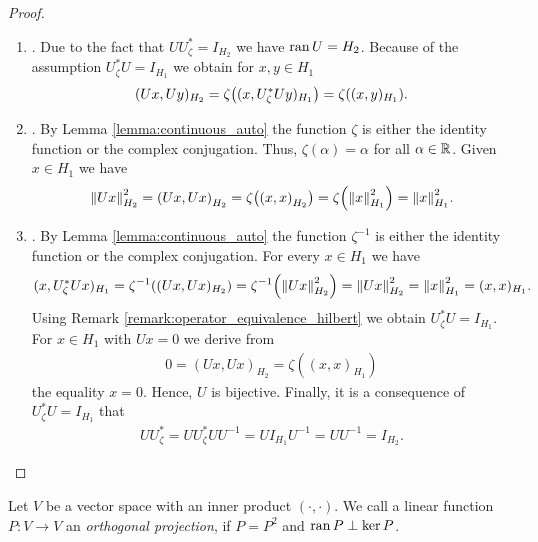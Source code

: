 \begin{proof}
	\begin{enumerate}
		\phantom{}
		\item[]. Due to the fact that $U U_\zeta^\ast = I_{H_2}$ we have $\ran U = H_2$. Because of the assumption $U_\zeta^\ast U = I_{H_1}$ we obtain for $x,y \in H_1$ 
		\begin{align*}
			(Ux, Uy)_{H_2} = \zeta\pbraces{(x, U_\zeta^\ast U y)_{H_1}} = \zeta \pbraces{(x,y)_{H_1}}.
		\end{align*}
		
		\item[]. By Lemma \ref{lemma:continuous_auto} the function $\zeta$ is either the identity function or the complex conjugation. Thus, $\zeta(\alpha) = \alpha$ for all $\alpha \in \R$. Given $x \in H_1$ we have
		\begin{align*}
			\norm[H_2]{Ux}^2 = \pbraces{Ux, Ux}_{H_2} = \zeta\pbraces{\pbraces{x, x}_{H_2}} = \zeta\pbraces{\norm[H_1]{x}^2} = \norm[H_1]{x}^2.
		\end{align*} 
		
		\item[]. By Lemma \ref{lemma:continuous_auto} the function $\zeta^{-1}$ is either the identity function or the complex conjugation. For every $x \in H_1$ we have 
		\begin{align*}
			(x, U_\zeta^\ast U x)_{H_1} = \zeta^{-1}\pbraces{(Ux, Ux)_{H_2}} = \zeta^{-1} \pbraces{\norm[H_2]{Ux}^2} = \norm[H_2]{Ux}^2 = \norm[H_1]{x}^2 = (x,x)_{H_1}.
		\end{align*}
		Using Remark \ref{remark:operator_equivalence_hilbert} we obtain $U_\zeta^\ast U = I_{H_1}$. For $x \in H_1$ with $Ux = 0$ we derive from 
		\begin{align*}
			0 = (Ux, Ux)_{H_2} = \zeta((x,x)_{H_1})
		\end{align*}
		the equality $x = 0$. Hence, $U$ is bijective. Finally, it is a consequence of $U_\zeta^\ast U = I_{H_1}$ that
		\begin{align*}
			U U_\zeta^\ast = U U_\zeta^\ast UU^{-1} = UI_{H_1}U^{-1} = UU^{-1} = I_{H_2}.
		\end{align*}
	\end{enumerate}
\end{proof}


\begin{definition}
	Let $V$ be a vector space with an inner product $(\cdot, \cdot)$. We call a linear function $P: V \to V$ an \textit{orthogonal projection}, if $P = P^2$ and $\ran P \perp \ker P$.
\end{definition}


